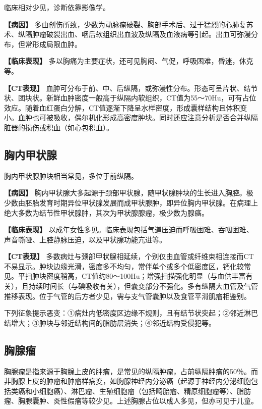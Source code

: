 临床相对少见，诊断依靠影像学。

\textbf{【病因】}
多由创伤所致，少数为动脉瘤破裂、胸部手术后、过于猛烈的心肺复苏术、纵隔肿瘤破裂出血、咽后软组织出血波及纵隔及血液病等引起。出血可弥漫分布，但常形成局限血肿。

\textbf{【临床表现】}
多以胸痛为主要症状，还可见胸闷、气促，呼吸困难，昏迷，休克等。

\textbf{【CT表现】}
血肿可分布于前、中、后纵隔，或弥漫性分布。形态可呈片状、结节状、团块状。新鲜血肿密度一般高于纵隔内软组织，CT值为55～70Hu，可有占位效应。随着血红蛋白分解，CT值逐渐下降呈水样密度，形成囊样结构且体积变小。血肿也可被吸收，偶尔机化形成高密度肿块。同时还应注意分析是否合并纵隔脏器的损伤或积血（如心包积血）。

\subsection{胸内甲状腺}

胸内甲状腺肿块相当常见，多位于前纵隔。

\textbf{【病因】}
胸内甲状腺大多起源于颈部甲状腺，随甲状腺肿块的生长进入胸腔。极少数由胚胎发育时期异位甲状腺发展而成甲状腺肿，即异位胸内甲状腺。在病理上绝大多数为结节性甲状腺肿，其次为甲状腺腺瘤，极少数为腺癌。

\textbf{【临床表现】}
以成年女性多见。临床表现包括气道压迫而呼吸困难、吞咽困难、声音嘶哑、上腔静脉压迫，以及甲状腺功能亢进等。

\textbf{【CT表现】}
多数病灶与颈部甲状腺相延续，个别仅由血管或纤维束相连接而CT不易显示。肿块边缘光滑，密度多不均匀，常伴单个或多个低密度区，钙化较常见。平扫肿块密度稍高，CT值约80～100Hu；增强扫描强化明显（与血供丰富有关），且持续时间长（与碘吸收有关），但囊变部分不强化。多有纵隔大血管及气管推移表现。位于气管的后方者少见，需与支气管囊肿以及食管平滑肌瘤相鉴别。

下列征象提示恶变：①病灶内低密度区边缘不规则，且有结节状突起；②邻近淋巴结增大；③肿块与邻近结构间的脂肪层消失；④邻近结构受侵犯等。

\subsection{胸腺瘤}

胸腺瘤是指来源于胸腺上皮的肿瘤，是常见的纵隔肿瘤，占前纵隔肿瘤的50％。而非胸腺上皮的肿瘤和肿瘤样病变，如胸腺神经内分泌癌（起源于神经内分泌细胞包括类癌和小细胞癌）、淋巴瘤、生殖细胞瘤（包括畸胎瘤、精原细胞瘤等）、脂肪瘤、胸腺囊肿、炎性假瘤等较少见。上述胸腺占位以成人多见，但亦可见于儿童。

